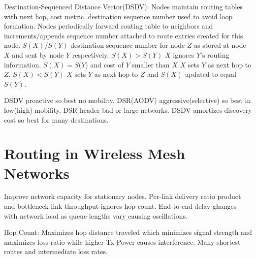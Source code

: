 \documentclass[8pt]{extarticle}
\begin{document}
\begin{multicols}{2}
Destination-Sequenced Distance Vector(DSDV): Nodes maintain routing tables with next hop, cost metric, destination sequence number used to avoid loop formation. Nodes periodically forward routing table to neighbors and increments/appends sequence number attached to route entries created for this node. $S(X)$/$S(Y)$ destination sequence number for node $Z$ as stored at node $X$ and sent by node $Y$ respectively. $S(X)>S(Y)$ $X$ ignores $Y$'s routing information. $S(X)=S(Y$) and cost of $Y$ smaller than $X$ $X$ sets $Y$ as next hop to $Z$. $S(X)<S(Y)$ $X$ sets $Y$ as next hop to $Z$ and $S(X)$ updated to equal $S(Y)$.

DSDV proactive so best no mobility. DSR(AODV) aggressive(selective) so best in low(high) mobility. DSR header bad or large networks. DSDV amortizes discovery cost so best for many destinations.

\section{Routing in Wireless Mesh Networks}

Improve network capacity for stationary nodes. Per-link delivery ratio product and bottleneck link throughput ignores hop count. End-to-end delay ghanges with network load as queue lengths vary causing oscillations.

Hop Count: Maximizes hop distance traveled which minimizes signal strength and maximizes loss ratio while higher Tx Power causes interference. Many shortest routes and intermediate loss rates.


\end{multicols}
\end{document}
